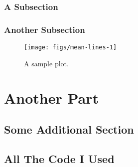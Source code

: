 \documentclass[
    numbers=noenddot,
    open=any,
    paper=a4,
    oneside,
    pagesize,
    captions=tableabove,
    bibliography=totoc,
    11pt
    ]{scrbook}
\begin{document}
\begin{table}[!h]

\caption{\label{tab:report}Data overview.}
\centering
{}
\end{table}

\hypertarget{a-subsection}{%
\section{A Subsection}\label{a-subsection}}

\hypertarget{another-subsection}{%
\section{Another Subsection}\label{another-subsection}}

\begin{figure}

{\centering \texttt{[image: figs/mean-lines-1]} 

}

\caption{A sample plot.}\label{fig:mean-lines}
\end{figure}

\hypertarget{another-part}{%
\part{Another Part}\label{another-part}}

\hypertarget{some-additional-section}{%
\chapter{Some Additional Section}\label{some-additional-section}}

\textcite{tarski1944semantic}

\textcite{dayal2009variation}

\hypertarget{all-the-code-i-used}{%
\chapter*{All The Code I Used}\label{all-the-code-i-used}}
\end{document}

